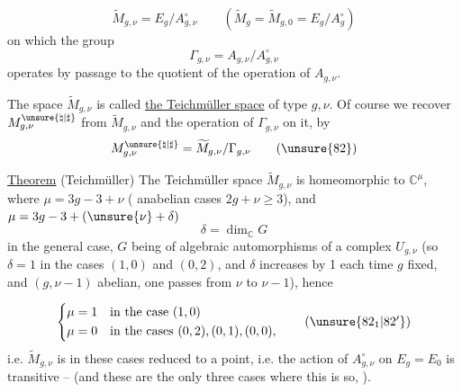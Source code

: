 \[
 \widetilde M_{g,\nu}=E_g/A_{g,\nu}^{\circ}
 \qquad
 (\widetilde M_g=\widetilde M_{g,0}=E_g/A_g^{\circ})
 \tag{81}
\]
on which the group 
\[
 \Gamma_{g,\nu}=A_{g,\nu}/A_{g,\nu}^{\circ}
\]
operates by passage to the quotient of the operation of \(A_{g,\nu}\).

 The space \(\widetilde M_{g,\nu}\)  is called \uline{the Teichmüller space} of type \(g,\nu\). Of course we recover \(M_{g,\nu}^{\unsure{\natural|\sharp}}\) from \(\widetilde M_{g,\nu}\) and  the operation of \(\Gamma_{g,\nu}\) on it, by
\[
 M_{g,\nu}^{\unsure{\natural|\sharp}}=\widetilde M_{g,\nu}/\Gamma_{g,\nu}
 \tag{\unsure{82}}
\]

\uline{Theorem} (Teichmüller) The Teichmüller space \(\widetilde M_{g,\nu}\) is homeomorphic to  \(\mathbb C^\mu\), where \(\mu=3g-3+\nu\) ( anabelian cases \(2g+\nu\geq 3\)), and \(\mu=3g-3+(\unsure{\nu}+\delta)\)
\[
 \delta=\dim_{\mathbb C}G
\]
in the general case, \(G\) being  of algebraic automorphisms of a complex \(U_{g,\nu}\) (so \(\delta=1\) in the  cases \((1,0)\) and \((0,2)\), and  \(\delta\) increases by 1 each time  \(g\) fixed, and \((g,\nu-1)\) abelian, one passes from \(\nu\) to \(\nu-1\)), hence



\[
 \left\{
 \begin{aligned}
 \mu&=1\quad\text{in the case }(1,0)\\
 \mu&=0\quad\text{in the cases }(0,2),(0,1),(0,0),
 \end{aligned}
 \right.
 \tag{\unsure{\(82_1\)|\(82'\)}}
\]
i.e. \(\widetilde M_{g,\nu}\) is in these cases reduced to a point, i.e. the action of \(A_{g,\nu}^{\circ}\) on \(E_g=E_0\) is  transitive -- (and these are  the only three cases where this is so, ).


